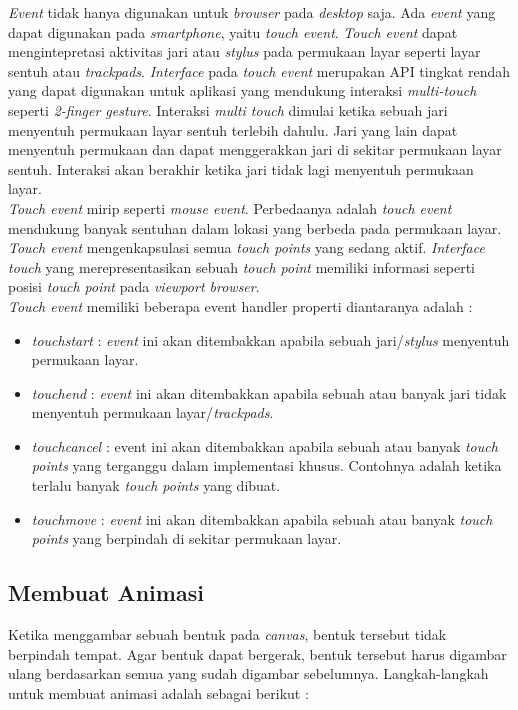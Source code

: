 \textit{Event} tidak hanya digunakan untuk \textit{browser} pada \textit{desktop} saja. Ada \textit{event} yang dapat digunakan pada \textit{smartphone}, yaitu \textit{touch event}. \textit{Touch event} dapat mengintepretasi aktivitas jari atau \textit{stylus} pada permukaan layar seperti layar sentuh atau \textit{trackpads}. \textit{Interface} pada \textit{touch event} merupakan API tingkat rendah yang dapat digunakan untuk aplikasi yang mendukung interaksi \textit{multi-touch} seperti \textit{2-finger gesture}. Interaksi \textit{multi touch} dimulai ketika sebuah jari menyentuh permukaan layar sentuh terlebih dahulu. Jari yang lain dapat menyentuh permukaan dan dapat menggerakkan jari di sekitar permukaan layar sentuh. Interaksi akan berakhir ketika jari tidak lagi menyentuh permukaan layar.\\

\textit{Touch event} mirip seperti \textit{mouse event}. Perbedaanya adalah \textit{touch event} mendukung banyak sentuhan dalam lokasi yang berbeda pada permukaan layar. \textit{Touch event} mengenkapsulasi semua \textit{touch points} yang sedang aktif. \textit{Interface touch} yang merepresentasikan sebuah \textit{touch point} memiliki informasi seperti posisi \textit{touch point} pada \textit{viewport browser}.\\

\textit{Touch event} memiliki beberapa event handler properti diantaranya adalah :

\begin{itemize}
	\item \textit{touchstart} : \textit{event} ini akan ditembakkan apabila sebuah jari/\textit{stylus} menyentuh permukaan layar.
	\item \textit{touchend} : \textit{event} ini akan ditembakkan apabila sebuah atau banyak jari tidak menyentuh permukaan layar/\textit{trackpads}.
	\item \textit{touchcancel} : event ini akan ditembakkan apabila sebuah atau banyak \textit{touch points} yang terganggu dalam implementasi khusus. Contohnya adalah ketika terlalu banyak \textit{touch points} yang dibuat.
	\item \textit{touchmove} : \textit{event} ini akan ditembakkan apabila sebuah atau banyak \textit{touch points} yang berpindah di sekitar permukaan layar. 
\end{itemize}

\subsection{Membuat Animasi}
Ketika menggambar sebuah bentuk pada \textit{canvas}, bentuk tersebut tidak berpindah tempat. Agar bentuk dapat bergerak, bentuk tersebut harus digambar ulang berdasarkan semua yang sudah digambar sebelumnya. Langkah-langkah untuk membuat animasi adalah sebagai berikut :

